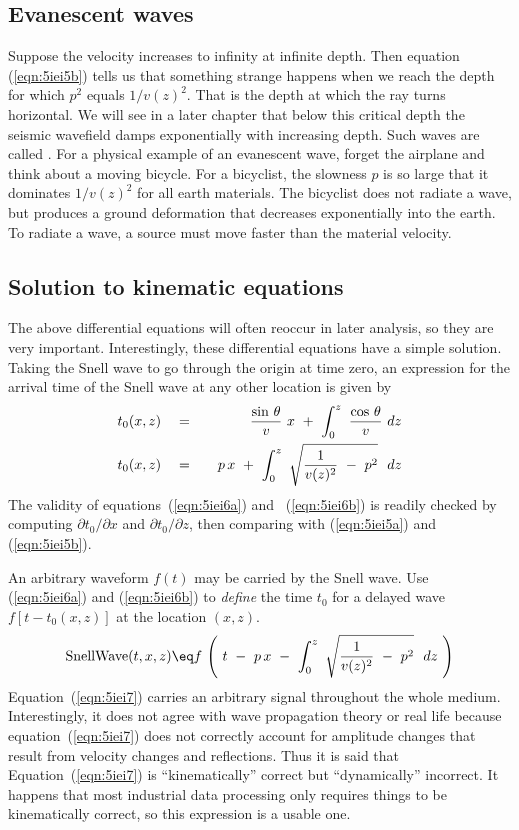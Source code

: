 \subsection{Evanescent waves}
Suppose the velocity increases to infinity at infinite depth.
Then equation (\ref{eqn:5iei5b}) tells us that something
strange happens when we reach the depth for which
$p^2$ equals $1/v(z)^2$.
That is the depth at which the ray turns horizontal.
We will see in a later chapter that below this critical depth
the seismic wavefield damps exponentially with increasing depth.
Such waves are called .
For a physical example of an evanescent wave,
forget the airplane and think about a moving bicycle.
For a bicyclist, the slowness $p$ is so large that it dominates $1/v(z)^2$
for all earth materials.
The bicyclist does not radiate a wave,
but produces a ground deformation
that decreases exponentially into the earth.
To radiate a wave,
a source must move faster than the material velocity.

\subsection{Solution to kinematic equations}
\par
The above differential equations will often reoccur in later analysis,
so they are very important.
Interestingly, these differential equations have a simple solution.
Taking the Snell wave to go through the origin at time zero,
an expression for the
arrival time of the Snell wave at any other location
is given by
\begin{eqnarray}
t_0(x,z) \ \ \ &=&\ \ \ {\sin\,\theta  \over v }\  x\ +\ \int_0^z\
{\cos\,\theta  \over v }\ d z
\label{eqn:5iei6a}
\\
t_0(x,z)\ \ \ &=&\ \ \ p\,x\ +\ \int_0^z\
\sqrt{ {1 \over v ( z ) ^2 }\ -\
p^2 } \ \ d z
\label{eqn:5iei6b}
\end{eqnarray}
The validity of equations~(\ref{eqn:5iei6a}) and~ (\ref{eqn:5iei6b})
is readily checked by
computing  $\partial t_0 / \partial x$  and  $\partial t_0 / \partial z $,
then comparing with (\ref{eqn:5iei5a}) and (\ref{eqn:5iei5b}).

\par
An arbitrary waveform  $f(t)$  may be carried by the Snell wave.
Use (\ref{eqn:5iei6a}) and (\ref{eqn:5iei6b}) to {\em  define} the time $t_0$ for
a delayed wave  $f[t-t_0 (x,z)]$  at the location  $(x,z)$.
\begin{equation}
\hbox{SnellWave}(t,x,z)\eq f \, \left( \  t\ -\
p\,x\ -\  \int_0^z\
\sqrt{ {1 \over v ( z )^2}\ -\ p^2 } \ \ dz \  \right)
\label{eqn:5iei7}
\end{equation}
Equation~(\ref{eqn:5iei7})
carries an arbitrary signal throughout the whole medium.
Interestingly, it does not agree with wave propagation theory
or real life because
equation~(\ref{eqn:5iei7}) does not correctly account for amplitude
changes that result from
velocity changes and reflections.
Thus it is said that
Equation~(\ref{eqn:5iei7})
is ``kinematically'' correct but ``dynamically'' incorrect.
It happens that most industrial data processing only requires
things to be kinematically correct,
so this expression is a usable one.

